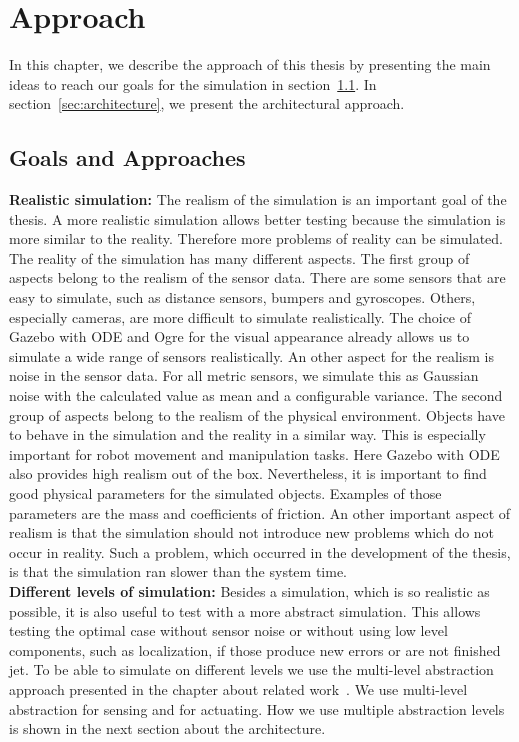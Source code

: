 \chapter{Approach}
\label{cha:approach}
In this chapter, we describe the approach of this thesis by presenting the main ideas to reach our goals for the simulation in section~\ref{sec:goals_and_approaches}. In section~\ref{sec:architecture}, we present the architectural approach.

\section{Goals and Approaches}
\label{sec:goals_and_approaches}
\textbf{Realistic simulation:} The realism of the simulation is an important goal of the thesis. A more realistic simulation allows better testing because the simulation is more similar to the reality. Therefore more problems of reality can be simulated. The reality of the simulation has many different aspects. The first group of aspects belong to the realism of the sensor data. There are some sensors that are easy to simulate, such as distance sensors, bumpers and gyroscopes. Others, especially cameras, are more difficult to simulate realistically. The choice of Gazebo with ODE and Ogre for the visual appearance already allows us to simulate a wide range of sensors realistically. An other aspect for the realism is noise in the sensor data. For all metric sensors, we simulate this as Gaussian noise with the calculated value as mean and a configurable variance. The second group of aspects belong to the realism of the physical environment. Objects have to behave in the simulation and the reality in a similar way. This is especially important for robot movement and manipulation tasks. Here Gazebo with ODE also provides high realism out of the box. Nevertheless, it is important to find good physical parameters for the simulated objects. Examples of those parameters are the mass and coefficients of friction. An other important aspect of realism is that the simulation should not introduce new problems which do not occur in reality. Such a problem, which occurred in the development of the thesis, is that the simulation ran slower than the system time.\\
\textbf{Different levels of simulation:} Besides a simulation, which is so realistic as possible, it is also useful to test with a more abstract simulation. This allows testing the optimal case without sensor noise or without using low level components, such as localization, if those produce new errors or are not finished jet. To be able to simulate on different levels we use the multi-level abstraction approach presented in the chapter about related work~\cite{MultiLevelAbstraction}. We use multi-level abstraction for sensing and for actuating. How we use multiple abstraction levels is shown in the next section about the architecture.\\
